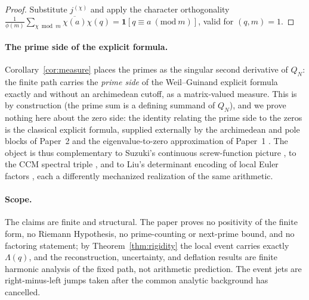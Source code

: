 \documentclass[11pt]{article}
\theoremstyle{plain}
\theoremstyle{definition}
\theoremstyle{remark}
\newcommand{\Lam}{\Lambda}
\begin{document}
\begin{proof}
Substitute $j^{(\chi)}$ and apply the character orthogonality
$\frac{1}{\phi(m)}\sum_{\chi\bmod m}\overline{\chi(a)}\chi(q)
=\mathbf 1[q\equiv a\ (\mathrm{mod}\ m)]$, valid for $(q,m)=1$.
\end{proof}

\paragraph{The prime side of the explicit formula.}
Corollary~\ref{cor:measure} places the primes as the singular second derivative
of $Q_N$: the finite path carries the \emph{prime side} of the Weil--Guinand
explicit formula \cite{Weil1952,IwaniecKowalski2004} exactly and without an
archimedean cutoff, as a matrix-valued measure. This is by construction (the
prime sum is a defining summand of $Q_N$), and we prove nothing here about the
zero side: the identity relating the prime side to the zeros is the classical
explicit formula, supplied externally by the archimedean and pole blocks of
Paper~2 \cite{Groskin2026FiniteDictionary} and the eigenvalue-to-zero
approximation of Paper~1 \cite{Groskin2026Paper1}. The object is thus
complementary to Suzuki's continuous screw-function picture \cite{Suzuki2026},
to the CCM spectral triple \cite{ConnesConsaniMoscovici2025}, and to Liu's
determinant encoding of local Euler factors \cite{Liu2026}, each a differently
mechanized realization of the same arithmetic.

\paragraph{Scope.}
The claims are finite and structural. The paper proves no positivity of the
finite form, no Riemann Hypothesis, no prime-counting or next-prime bound, and
no factoring statement; by Theorem~\ref{thm:rigidity} the local event carries
exactly $\Lam(q)$, and the reconstruction, uncertainty, and deflation results are
finite harmonic analysis of the fixed path, not arithmetic prediction. The event
jets are right-minus-left jumps taken after the common analytic background has
cancelled.
\end{document}
